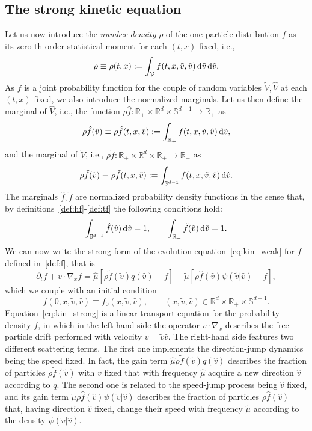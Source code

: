 \documentclass[a4paper]{article}
\theoremstyle{Theorem}\newtheorem{proposition}{Proposition}[section]
\theoremstyle{Remark}\newtheorem{remark}{Remark}[section]
\theoremstyle{Theorem}\newtheorem{theorem}{Theorem}[section]
\newcommand{\R}{\mathbb{R}}
\newcommand{\hv}{\hat{v}}
\newcommand{\tv}{\tilde{v}}
\newcommand{\hf}{\hat{f}}
\newcommand{\tf}{\tilde{f}}
\newcommand{\hV}{\hat{V}}
\newcommand{\tV}{\tilde{V}}
\newcommand{\hmu}{\hat{\mu}}
\newcommand{\tmu}{\tilde{\mu}}
\newcommand{\intS}{\int_{\mathbb{S}^{d-1}}}
\newcommand{\intR}{\int_{\R_+}}
\newcommand{\intV}{\int_{\mathcal{V}}}
\begin{document}
\subsection{The strong kinetic equation}
Let us now introduce the \textit{number density} $\rho$ of the one particle distribution $f$ as its zero-th order statistical moment for each $(t,x)$ fixed, i.e.,
\begin{equation}\label{def:bf}
\rho \equiv \rho(t,x):=\intV f(t,x,\tv,\hv) \, {\rm d} \tv \, {\rm d}\hv.
\end{equation}
As $f$ is a joint probability function for the couple of random variables $\tV, \hV$ at each $(t,x)$ fixed, we also introduce the normalized marginals. Let us then define the marginal of $\hV$, i.e., the function ${\rho \hf: \R_+\times \R^d \times \mathbb{S}^{d-1}\to \R_+}$ as
\begin{equation}\label{def:hf}
\rho \hf (\hv) \equiv \rho \hf(t,x,\hv):=  \intR f(t,x,\tv,\hv) \, {\rm d} \tv, 
\end{equation}
and the marginal of $\tV$, i.e., $\rho \tf: \R_+\times \R^d \times \R_+ \to \R_+$ as
\begin{equation}\label{def:tf}
 \rho  \tf(\tv) \equiv \rho \tf(t,x,\tv):= \intS f(t,x,\tv,\hv) \, {\rm d} \hv.
\end{equation}
The marginals $\hf, \tf$ are normalized probability density functions in the sense that, by definitions~\eqref{def:hf}-\eqref{def:tf} the following conditions hold:
\begin{equation}\label{norm.marg}
\intS \hf(\hv) \, {\rm d} \hv =1, \qquad \intR \tf(\tv) \, {\rm d} \tv =1.
\end{equation}
We can now write the strong form of the evolution equation~\eqref{eq:kin_weak} for $f$ defined in~\eqref{def:f}, that is
\begin{equation}\label{eq:kin_strong}
\partial_t f +v \cdot \nabla_x f = \hmu \left[\rho\tf(\tv) q(\hv) -f\right] +  \tmu\left[\rho\hf(\hv)\psi(\tv|\hv)-f\right], 
\end{equation}
which we couple with an initial condition
\begin{equation}\label{ci}
    f(0,x,\tv,\hv)\equiv f_0(x,\tv,\hv), \qquad (x,\tv,\hv) \in \R^d\times \R_+ \times \mathbb{S}^{d-1}.
\end{equation}
Equation~\eqref{eq:kin_strong} is a linear transport equation for the probability density $f$, in which in the left-hand side the operator $v\cdot \nabla_x$ describes the free particle drift performed with velocity $v=\tv \hv$. The right-hand side features two different scattering terms. The first one implements the direction-jump dynamics being the speed fixed. In fact, the gain term $\hmu \rho\tf(\tv) q(\hv)$ describes the fraction of particles $\rho \tf(\tv)$ with $\tv$ fixed that with frequency $\hmu$ acquire a new direction $\hv$ according to $q$. The second one is related to the speed-jump process being $\hv$ fixed, and its gain term $\tmu \rho\hf(\hv)\psi(\tv|\hv)$ describes the fraction of particles $\rho\hf(\hv)$ that, having direction $\hv$ fixed, change their speed with frequency $\tmu$ according to the density $\psi(\tv|\hv)$. 
\end{document}
